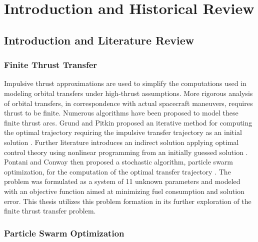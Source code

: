 \chapter{Introduction and Historical Review}
\newpage

\section{Introduction and Literature Review}

\subsection{Finite Thrust Transfer}

\noindent Impulsive thrust approximations are used to simplify the computations used in modeling orbital transfers under high-thrust assumptions.
More rigorous analysis of orbital transfers, in correspondence with actual spacecraft maneuvers, requires thrust to be finite. Numerous algorithms have been
proposed to model these finite thrust arcs. Grund and Pitkin proposed an iterative method for computing the optimal trajectory requiring the impulsive transfer trajectory as
an initial solution \citep{Fthrust1}. Further literature introduces an indirect solution applying optimal control theory using nonlinear programming from an initially guessed
solution \citep{Fthrust2}. Pontani and Conway then proposed a stochastic algorithm, particle swarm optimization, for the computation of the optimal transfer trajectory \citep{Pontani_Conway}. The problem was formulated as 
a system of 11 unknown parameters and modeled with an objective function aimed at minimizing fuel consumption
and solution error. This thesis utilizes this problem formation in its further exploration of the finite thrust transfer problem.

\subsection{Particle Swarm Optimization}

